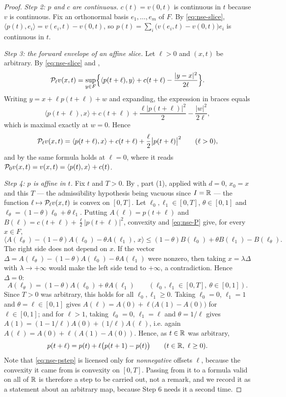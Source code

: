 \begin{proof}
\emph{Step 2: $p$ and $c$ are continuous.}
$c(t)=v(0,t)$ is continuous in $t$ because $v$ is continuous. Fix an orthonormal
basis $e_1,\dots,e_m$ of $F$. By \eqref{eq:nse-slice},
$\langle p(t),e_i\rangle=v(e_i,t)-v(0,t)$, so
$p(t)=\sum_i\bigl(v(e_i,t)-v(0,t)\bigr)e_i$ is continuous in $t$.

\emph{Step 3: the forward envelope of an affine slice.}
Let $\ell>0$ and $(x,t)$ be arbitrary. By \eqref{eq:nse-slice} and
,
\[
  \mathcal{P}_\ell v(x,t)
   =\sup_{y\in F}\Bigl\{\langle p(t+\ell),y\rangle+c(t+\ell)
      -\frac{|y-x|^2}{2\ell}\Bigr\}.
\]
Writing $y=x+\ell p(t+\ell)+w$ and expanding, the expression in braces equals
\[
  \langle p(t+\ell),x\rangle+c(t+\ell)+\frac{\ell|p(t+\ell)|^2}{2}
    -\frac{|w|^2}{2\ell},
\]
which is maximal exactly at $w=0$. Hence
\begin{equation}\label{eq:nse-P}
  \mathcal{P}_\ell v(x,t)=\langle p(t+\ell),x\rangle+c(t+\ell)
     +\frac{\ell}{2}\bigl|p(t+\ell)\bigr|^2\qquad(\ell>0),
\end{equation}
and by  the same formula holds at $\ell=0$, where it reads
$\mathcal{P}_0v(x,t)=v(x,t)=\langle p(t),x\rangle+c(t)$.

\emph{Step 4: $p$ is affine in $t$.}
Fix $t$ and $T>0$. By , part (1), applied with
$d=0$, $x_0=x$ and this $T$ — the admissibility hypothesis being vacuous since
$I=\mathbb{R}$ — the function $\ell\mapsto\mathcal{P}_\ell v(x,t)$ is convex on $[0,T]$. Let
$\ell_0,\ell_1\in[0,T]$, $\theta\in[0,1]$ and
$\ell_\theta=(1-\theta)\ell_0+\theta\ell_1$. Putting $A(\ell)=p(t+\ell)$ and
$B(\ell)=c(t+\ell)+\tfrac\ell2|p(t+\ell)|^2$, convexity and \eqref{eq:nse-P}
give, for every $x\in F$,
\[
  \bigl\langle A(\ell_\theta)-(1-\theta)A(\ell_0)-\theta A(\ell_1),\,x\bigr\rangle
   \le(1-\theta)B(\ell_0)+\theta B(\ell_1)-B(\ell_\theta).
\]
The right side does not depend on $x$. If the vector
$\Delta=A(\ell_\theta)-(1-\theta)A(\ell_0)-\theta A(\ell_1)$ were nonzero, then
taking $x=\lambda\Delta$ with $\lambda\to+\infty$ would make the left side tend
to $+\infty$, a contradiction. Hence $\Delta=0$:
\[
  A(\ell_\theta)=(1-\theta)A(\ell_0)+\theta A(\ell_1)
  \qquad(\ell_0,\ell_1\in[0,T],\ \theta\in[0,1]).
\]
Since $T>0$ was arbitrary, this holds for all $\ell_0,\ell_1\ge0$. Taking
$\ell_0=0$, $\ell_1=1$ and $\theta=\ell\in[0,1]$ gives
$A(\ell)=A(0)+\ell\bigl(A(1)-A(0)\bigr)$ for $\ell\in[0,1]$; and for $\ell>1$,
taking $\ell_0=0$, $\ell_1=\ell$ and $\theta=1/\ell$ gives
$A(1)=(1-1/\ell)A(0)+(1/\ell)A(\ell)$, i.e. again
$A(\ell)=A(0)+\ell(A(1)-A(0))$. Hence, as $t\in\mathbb{R}$ was arbitrary,
\begin{equation}\label{eq:nse-pstep}
  p(t+\ell)=p(t)+\ell\bigl(p(t+1)-p(t)\bigr)\qquad(t\in\R,\ \ell\ge0).
\end{equation}
Note that \eqref{eq:nse-pstep} is licensed only for \emph{nonnegative} offsets
$\ell$, because the convexity it came from is convexity on $[0,T]$. Passing from
it to a formula valid on all of $\mathbb{R}$ is therefore a step to be carried out, not a
remark, and we record it as a statement about an arbitrary map, because Step 6
needs it a second time.


\end{proof}
